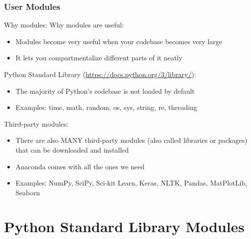 \documentclass{beamer}
\begin{document}
\begin{frame}	
	\frametitle{User Modules}
	
	\begin{block}{Why modules:}
		Why modules are useful:
		\begin{itemize}
			\item Modules become very useful when your codebase becomes very large
			\item It lets you compartmentalize different parts of it neatly
		\end{itemize}
		Python Standard Library (\href{https://docs.python.org/3/library/}{https://docs.python.org/3/library/}):
		\begin{itemize}
			\item The majority of Python's codebase is not loaded by default
			\item Examples: time, math, random, os, sys, string, re, threading
		\end{itemize}
		Third-party modules:
		\begin{itemize}
			\item There are also MANY third-party modules (also called libraries or packages) that can be downloaded and installed
			\item Anaconda comes with all the ones we need
			\item Examples: NumPy, SciPy, Sci-kit Learn, Keras, NLTK, Pandas, MatPlotLib, Seaborn
		\end{itemize}
	\end{block}
	
\end{frame}


\section{Python Standard Library Modules}

\begin{frame}	
\end{frame}
\end{document}
